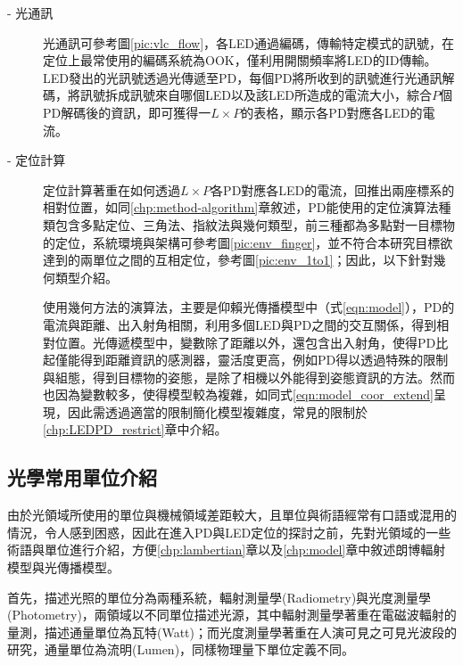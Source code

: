     \begin{description}
        \item[- 光通訊]\hfill
        
        \qquad 
        光通訊可參考圖\ref{pic:vlc_flow}，各LED通過編碼，傳輸特定模式的訊號，在定位上最常使用的編碼系統為OOK，僅利用開關頻率將LED的ID傳輸。LED發出的光訊號透過光傳遞至PD，每個PD將所收到的訊號進行光通訊解碼，將訊號拆成訊號來自哪個LED以及該LED所造成的電流大小，綜合$P$個PD解碼後的資訊，即可獲得一$L\times P$的表格，顯示各PD對應各LED的電流。
        
        \item[- 定位計算] \hfill
        
        \qquad
        定位計算著重在如何透過$L\times P$各PD對應各LED的電流，回推出兩座標系的相對位置，如同\ref{chp:method-algorithm}章敘述，PD能使用的定位演算法種類包含多點定位、三角法、指紋法與幾何類型，前三種都為多點對一目標物的定位，系統環境與架構可參考圖\ref{pic:env_finger}，並不符合本研究目標欲達到的兩單位之間的互相定位，參考圖\ref{pic:env_1to1}；因此，以下針對幾何類型介紹。

        \qquad
        使用幾何方法的演算法，主要是仰賴光傳播模型中（式\ref{eqn:model}），PD的電流與距離、出入射角相關，利用多個LED與PD之間的交互關係，得到相對位置。光傳遞模型中，變數除了距離以外，還包含出入射角，使得PD比起僅能得到距離資訊的感測器，靈活度更高，例如PD得以透過特殊的限制與組態，得到目標物的姿態\cite{case:orient}，是除了相機以外能得到姿態資訊的方法。然而也因為變數較多，使得模型較為複雜，如同式\ref{eqn:model_coor_extend}呈現，因此需透過適當的限制簡化模型複雜度，常見的限制於\ref{chp:LEDPD_restrict}章中介紹。
    \end{description}


    \subsection{光學常用單位介紹}
    \label{chp:light_unit}
        
        由於光領域所使用的單位與機械領域差距較大，且單位與術語經常有口語或混用的情況，令人感到困惑，因此在進入PD與LED定位的探討之前，先對光領域的一些術語與單位進行介紹，方便\ref{chp:lambertian}章以及\ref{chp:model}章中敘述朗博輻射模型與光傳播模型。

        首先，描述光照的單位分為兩種系統，輻射測量學(Radiometry)與光度測量學(Photometry)，兩領域以不同單位描述光源，其中輻射測量學著重在電磁波輻射的量測，描述通量單位為瓦特(Watt)；而光度測量學著重在人演可見之可見光波段的研究，通量單位為流明(Lumen)，同樣物理量下單位定義不同\cite{radiometry_and_photometry}。
        

